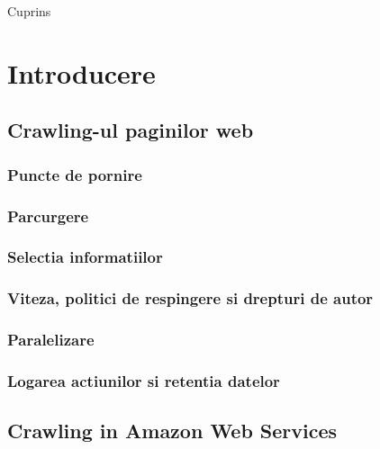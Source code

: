 \documentclass[12pt,oneside]{report}
\newcommand{\chaptertitle}[1]{\LARGE{#1}}
\renewcommand{\tableofcontents}{\LARGE{Cuprins}}
\begin{document}
\tableofcontents
\clearpage

\chapter*{\chaptertitle{Introducere}}

\clearpage

\section{Crawling-ul paginilor web}


\subsection{Puncte de pornire}


\subsection{Parcurgere}


\subsection{Selectia informatiilor}


\subsection{Viteza, politici de respingere si drepturi de autor}


\subsection{Paralelizare}


\subsection{Logarea actiunilor si retentia datelor}

\clearpage

\section{Crawling in Amazon Web Services}



\end{document}
